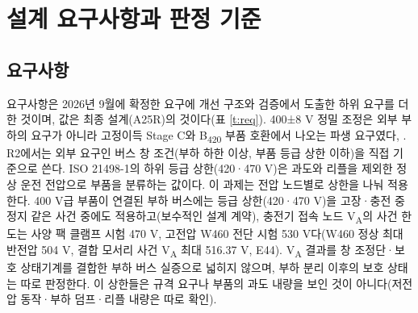 \chapter{설계 요구사항과 판정 기준}

\section{요구사항}

요구사항은 2026년 9월에 확정한 요구에 개선 구조와 검증에서 도출한 하위 요구를 더한 것이며, 값은 최종 설계(A25R)의 것이다(표 \ref{t:req}). 400±8 V 정밀 조정은 외부 부하의 요구가 아니라 고정이득 Stage C와 B\textsubscript{420} 부품 호환에서 나오는 파생 요구였다\cite{b9}, \cite{b10}. R2에서는 외부 요구인 버스 창 조건(부하 하한 이상, 부품 등급 상한 이하)을 직접 기준으로 쓴다. ISO 21498-1의 하위 등급 상한(420·470 V)은 과도와 리플을 제외한 정상 운전 전압으로 부품을 분류하는 값이다\cite{b9}. 이 과제는 전압 노드별로 상한을 나눠 적용한다. 400 V급 부품이 연결된 부하 버스에는 등급 상한(420·470 V)을 고장·충전 중 정지 같은 사건 중에도 적용하고(보수적인 설계 계약), 충전기 접속 노드 V\textsubscript{A}의 사건 한도는 사양 팩 클램프 시험 470 V, 고전압 W460 전단 시험 530 V다(W460 정상 최대 반전압 504 V, 결합 모서리 사건 V\textsubscript{A} 최대 516.37 V, E44). V\textsubscript{A} 결과를 창 조정단·보호 상태기계를 결합한 부하 버스 실증으로 넓히지 않으며, 부하 분리 이후의 보호 상태는 따로 판정한다. 이 상한들은 규격 요구나 부품의 과도 내량을 보인 것이 아니다(저전압 동작·부하 덤프·리플 내량은 따로 확인).

